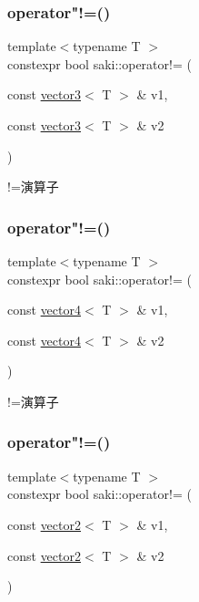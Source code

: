 \subsubsection{\texorpdfstring{operator"!=()}{operator!=()}\hspace{0.1cm}{\footnotesize\ttfamily [3/11]}}
{\footnotesize\ttfamily template$<$typename T $>$ \\
constexpr bool saki\+::operator!= (\begin{DoxyParamCaption}\item[{const \mbox{\hyperlink{classsaki_1_1vector3}{vector3}}$<$ T $>$ \&}]{v1,  }\item[{const \mbox{\hyperlink{classsaki_1_1vector3}{vector3}}$<$ T $>$ \&}]{v2 }\end{DoxyParamCaption})}



!=演算子 

\mbox{\label{namespacesaki_a6805502ef12cd12f6be61a958fd35aa7}} 
\subsubsection{\texorpdfstring{operator"!=()}{operator!=()}\hspace{0.1cm}{\footnotesize\ttfamily [4/11]}}
{\footnotesize\ttfamily template$<$typename T $>$ \\
constexpr bool saki\+::operator!= (\begin{DoxyParamCaption}\item[{const \mbox{\hyperlink{classsaki_1_1vector4}{vector4}}$<$ T $>$ \&}]{v1,  }\item[{const \mbox{\hyperlink{classsaki_1_1vector4}{vector4}}$<$ T $>$ \&}]{v2 }\end{DoxyParamCaption})}



!=演算子 

\mbox{\label{namespacesaki_ac0c806d3237b6718e95e9b71f838bcc1}} 
\subsubsection{\texorpdfstring{operator"!=()}{operator!=()}\hspace{0.1cm}{\footnotesize\ttfamily [5/11]}}
{\footnotesize\ttfamily template$<$typename T $>$ \\
constexpr bool saki\+::operator!= (\begin{DoxyParamCaption}\item[{const \mbox{\hyperlink{classsaki_1_1vector2}{vector2}}$<$ T $>$ \&}]{v1,  }\item[{const \mbox{\hyperlink{classsaki_1_1vector2}{vector2}}$<$ T $>$ \&}]{v2 }\end{DoxyParamCaption})}



